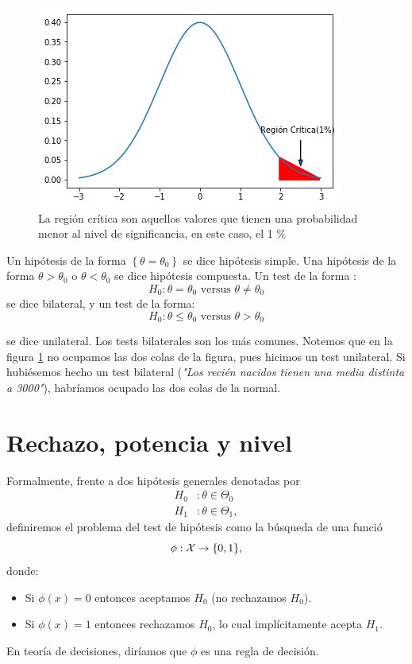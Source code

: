 \begin{figure}[ht]
    \centering
    \includegraphics[scale=0.7]{img/Region_critica.png}
    \caption{La región crítica son aquellos valores que tienen una probabilidad menor al nivel de significancia, en este caso, el 1 $\%$}
    \label{fig:region_critica}
\end{figure}
\begin{remark}
Un hipótesis de la forma $\left \{ \theta=\theta_0\right \}$ se dice hipótesis simple. Una hipótesis de la forma $\theta > \theta_0$ o $\theta < \theta_0$ se dice hipótesis compuesta. Un test de la forma :
 $$
 H_0: \theta=\theta_0 \text{ versus } \theta \not = \theta_0
 $$
se dice bilateral, y un test de la forma: 
$$
H_0: \theta \leq \theta_0 \text{ versus } \theta > \theta_0
$$

se dice unilateral. Los tests bilaterales son los más comunes.  Notemos que en la figura \ref{fig:region_critica} no ocupamos las dos colas de la figura, pues hicimos un test unilateral. Si hubiésemos hecho un test bilateral (\emph{"Los recién nacidos tienen una media distinta a 3000"}), habríamos ocupado las dos colas de la normal. 
\end{remark}



\section{Rechazo, potencia y nivel} 
\label{sec:def_hipótesis}

Formalmente, frente a dos hipótesis generales denotadas por 
\begin{align}
	H_0&: \theta\in\Theta_0\\
	H_1&: \theta\in\Theta_1,
\end{align}
definiremos el problema del test de hipótesis como la búsqueda de una funció
\begin{equation}
	\phi:{\mathcal X}\rightarrow \{0,1\},
\end{equation}
donde:
\begin{itemize}
	\item Si $\phi(x)=0$ entonces aceptamos $H_0$ (no rechazamos $H_0$).
	\item Si $\phi(x)=1$ entonces rechazamos $H_0$, lo cual implícitamente acepta $H_1$. 
\end{itemize}
En teoría de decisiones, diríamos que $\phi$ es una regla de decisión. 

